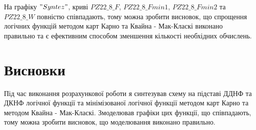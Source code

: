 \documentclass{article}
\begin{document}
\begin{normalsize}
	На графіку $"Syntez"$, криві $PZ22\_8\_F$, $PZ22\_8\_Fmin1$, $PZ22\_8\_Fmin2$ та $PZ22\_8\_W$ повністю співпадають, тому можна зробити висновок, що спрощення логічних функцій методом карт Карно та Квайна - Мак-Класкі виконано правильно та є ефективним способом зменшення кількості необхідних обчислень.

	\section*{Висновки}
	Під час виконання розрахункової роботи я синтезував схему на підставі ДДНФ та ДКНФ логічної функції та мінімізованої логічної функції методом карт Карно та методом Квайна - Мак-Класкі. Змоделював графіки цих функції, що співпадають, тому можна зробити висновок, що моделювання виконано правильно.
	    
\end{normalsize}
\end{document}

